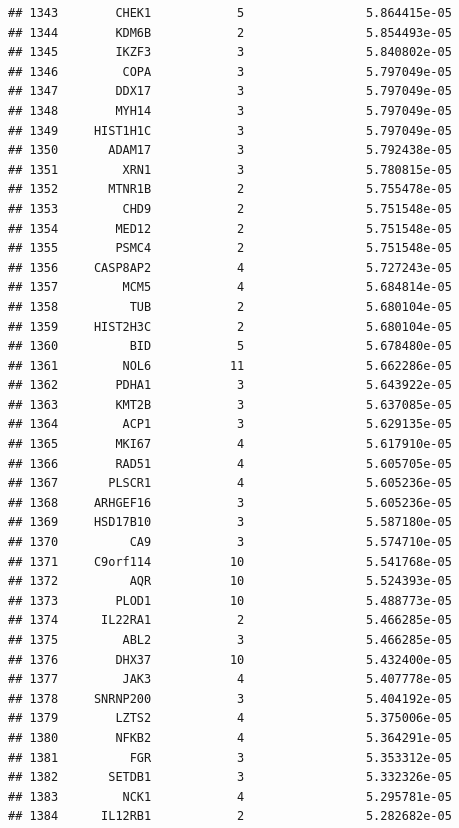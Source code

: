 \documentclass[
]{article}
\begin{document}
\begin{verbatim}
## 1343        CHEK1            5                 5.864415e-05
## 1344        KDM6B            2                 5.854493e-05
## 1345        IKZF3            3                 5.840802e-05
## 1346         COPA            3                 5.797049e-05
## 1347        DDX17            3                 5.797049e-05
## 1348        MYH14            3                 5.797049e-05
## 1349     HIST1H1C            3                 5.797049e-05
## 1350       ADAM17            3                 5.792438e-05
## 1351         XRN1            3                 5.780815e-05
## 1352       MTNR1B            2                 5.755478e-05
## 1353         CHD9            2                 5.751548e-05
## 1354        MED12            2                 5.751548e-05
## 1355        PSMC4            2                 5.751548e-05
## 1356     CASP8AP2            4                 5.727243e-05
## 1357         MCM5            4                 5.684814e-05
## 1358          TUB            2                 5.680104e-05
## 1359     HIST2H3C            2                 5.680104e-05
## 1360          BID            5                 5.678480e-05
## 1361         NOL6           11                 5.662286e-05
## 1362        PDHA1            3                 5.643922e-05
## 1363        KMT2B            3                 5.637085e-05
## 1364         ACP1            3                 5.629135e-05
## 1365        MKI67            4                 5.617910e-05
## 1366        RAD51            4                 5.605705e-05
## 1367       PLSCR1            4                 5.605236e-05
## 1368     ARHGEF16            3                 5.605236e-05
## 1369     HSD17B10            3                 5.587180e-05
## 1370          CA9            3                 5.574710e-05
## 1371     C9orf114           10                 5.541768e-05
## 1372          AQR           10                 5.524393e-05
## 1373        PLOD1           10                 5.488773e-05
## 1374      IL22RA1            2                 5.466285e-05
## 1375         ABL2            3                 5.466285e-05
## 1376        DHX37           10                 5.432400e-05
## 1377         JAK3            4                 5.407778e-05
## 1378     SNRNP200            3                 5.404192e-05
## 1379        LZTS2            4                 5.375006e-05
## 1380        NFKB2            4                 5.364291e-05
## 1381          FGR            3                 5.353312e-05
## 1382       SETDB1            3                 5.332326e-05
## 1383         NCK1            4                 5.295781e-05
## 1384      IL12RB1            2                 5.282682e-05

\end{verbatim}
\end{document}
